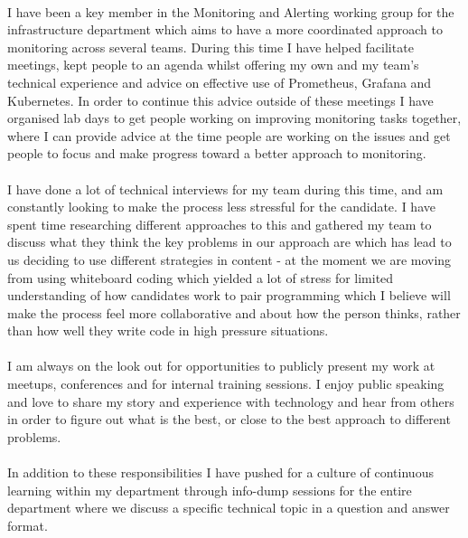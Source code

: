 \documentclass{article}
\begin{document}
\begin{flushleft}
\paragraph{}I have been a key member in the Monitoring and Alerting working group for the infrastructure department which aims to have a more coordinated approach to monitoring across several teams. During this time I have helped facilitate meetings, kept people to an agenda whilst offering my own and my team's technical experience and advice on effective use of Prometheus, Grafana and Kubernetes. In order to continue this advice outside of these meetings I have organised lab days to get people working on improving monitoring tasks together, where I can provide advice at the time people are working on the issues and get people to focus and make progress toward a better approach to monitoring.

\paragraph{}I have done a lot of technical interviews for my team during this time, and am constantly looking to make the process less stressful for the candidate. I have spent time researching different approaches to this and gathered my team to discuss what they think the key problems in our approach are which has lead to us deciding to use different strategies in content - at the moment we are moving from using whiteboard coding which yielded a lot of stress for limited understanding of how candidates work to pair programming which I believe will make the process feel more collaborative and about how the person thinks, rather than how well they write code in high pressure situations.

\paragraph{} I am always on the look out for opportunities to publicly present my work at meetups, conferences and for internal training sessions. I enjoy public speaking and love to share my story and experience with technology and hear from others in order to figure out what is the best, or close to the best approach to different problems. 

\paragraph{}In addition to these responsibilities I have pushed for a culture of continuous learning within my department through info-dump sessions for the entire department where we discuss a specific technical topic in a question and answer format.\\[10pt]


\end{flushleft}
\end{document}
